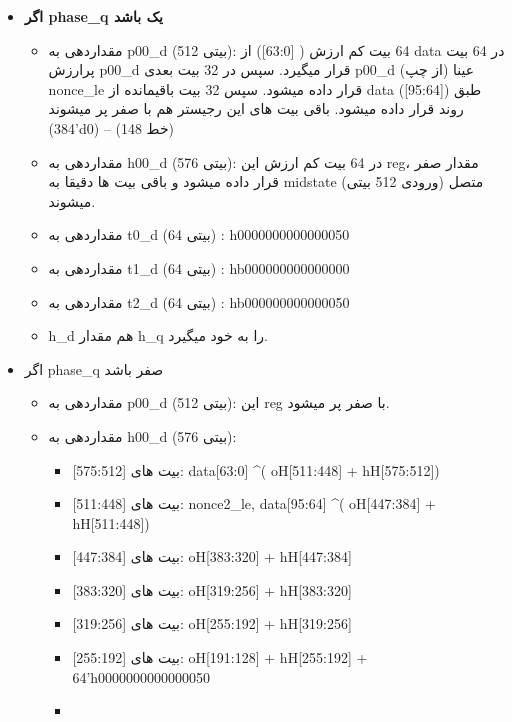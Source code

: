 \begin{itemize}
	\item
	      \textbf{اگر phase\_q یک باشد}
	      \begin{itemize}
	      	\item
	      	      مقداردهی به p00\_d (512 بیتی): 64 بیت کم ارزش ( [63:0]) از data در 64 بیت پرارزش p00\_d قرار میگیرد. سپس در 32 بیت بعدی p00\_d (از چپ) عینا nonce\_le قرار داده میشود. سپس 32 بیت باقیمانده از data ([95:64]) طبق روند قرار داده میشود. باقی بیت های این رجیستر هم با صفر پر میشوند (384’d0) – (خط 148)
	      	\item
	      	      مقداردهی به h00\_d (576 بیتی): در 64 بیت کم ارزش این reg، مقدار صفر قرار داده میشود و باقی بیت ها دقیقا به midstate (ورودی 512 بیتی) متصل میشوند.
	      	\item
	      	      مقداردهی به t0\_d (64 بیتی) : h0000000000000050
	      	\item
	      	      مقداردهی به t1\_d (64 بیتی) : hb000000000000000
	      	\item
	      	      مقداردهی به t2\_d (64 بیتی) : hb000000000000050
	      	\item
	      	      h\_d هم مقدار h\_q را به خود میگیرد.
	      \end{itemize}
	\item
	      اگر phase\_q صفر باشد
	      \begin{itemize}
	      	\item
	      	      مقداردهی به p00\_d (512 بیتی): این reg با صفر پر میشود.
	      	\item
	      	      مقداردهی به h00\_d (576 بیتی):
	      	      \begin{itemize}
	      	      	\item
	      	      	      بیت های [575:512]:		data[63:0] \textasciicircum ( oH[511:448] + hH[575:512])
	      	      	\item
	      	      	      بیت های [511:448]: 	{ nonce2\_le, data[95:64] } \textasciicircum ( oH[447:384] + hH[511:448])
	      	      	\item
	      	      	      بیت های [447:384]:  	oH[383:320] + hH[447:384]
	      	      	\item
	      	      	      بیت های [383:320]:	oH[319:256] + hH[383:320]
	      	      	\item
	      	      	      بیت های [319:256]:	oH[255:192] + hH[319:256]
	      	      	\item
	      	      	      بیت های [255:192]:	oH[191:128] + hH[255:192] + 64'h0000000000000050
	      	      	\item

\end{itemize}
\end{itemize}
\end{itemize}
